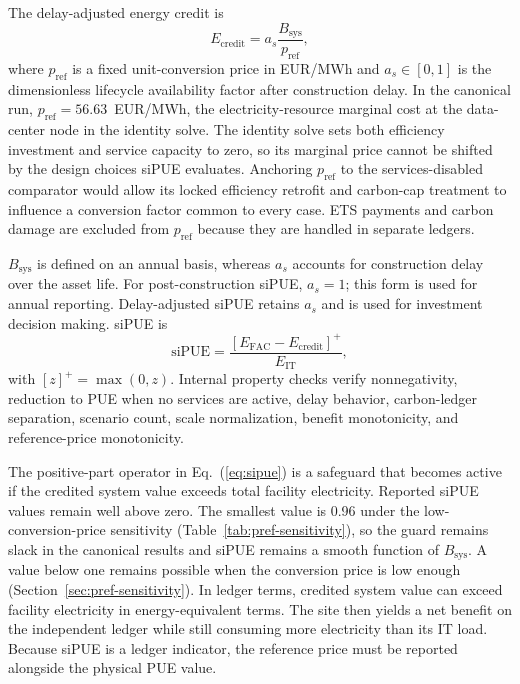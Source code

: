 \documentclass[preprint,12pt]{elsarticle}
\begin{document}
The delay-adjusted energy credit is
\begin{equation}
E_{\text{credit}} =
a_s \frac{B_{\text{sys}}}{p_{\text{ref}}},
\label{eq:sipue-credit}
\end{equation}
where $p_{\text{ref}}$ is a fixed unit-conversion price in EUR/MWh and $a_s \in [0,1]$ is the dimensionless lifecycle availability factor after construction delay. In the canonical run, $p_{\text{ref}}=56.63$~EUR/MWh, the electricity-resource marginal cost at the data-center node in the identity solve. The identity solve sets both efficiency investment and service capacity to zero, so its marginal price cannot be shifted by the design choices siPUE evaluates. Anchoring $p_{\text{ref}}$ to the services-disabled comparator would allow its locked efficiency retrofit and carbon-cap treatment to influence a conversion factor common to every case. ETS payments and carbon damage are excluded from $p_{\text{ref}}$ because they are handled in separate ledgers.

$B_{\mathrm{sys}}$ is defined on an annual basis, whereas $a_s$ accounts for construction delay over the asset life. For post-construction siPUE, $a_s=1$; this form is used for annual reporting. Delay-adjusted siPUE retains $a_s$ and is used for investment decision making.
siPUE is
\begin{equation}
\text{siPUE} =
\frac{\left[E_{\text{FAC}} - E_{\text{credit}}\right]^+}{E_{\text{IT}}},
\label{eq:sipue}
\end{equation}
with $[z]^+=\max(0,z)$. Internal property checks verify nonnegativity, reduction to PUE when no services are active, delay behavior, carbon-ledger separation, scenario count, scale normalization, benefit monotonicity, and reference-price monotonicity.

The positive-part operator in Eq.~(\ref{eq:sipue}) is a safeguard that becomes active if the credited system value exceeds total facility electricity. Reported siPUE values remain well above zero. The smallest value is 0.96 under the low-conversion-price sensitivity (Table~\ref{tab:pref-sensitivity}), so the guard remains slack in the canonical results and siPUE remains a smooth function of $B_{\text{sys}}$. A value below one remains possible when the conversion price is low enough (Section~\ref{sec:pref-sensitivity}). In ledger terms, credited system value can exceed facility electricity in energy-equivalent terms. The site then yields a net benefit on the independent ledger while still consuming more electricity than its IT load. Because siPUE is a ledger indicator, the reference price must be reported alongside the physical PUE value.
\end{document}
